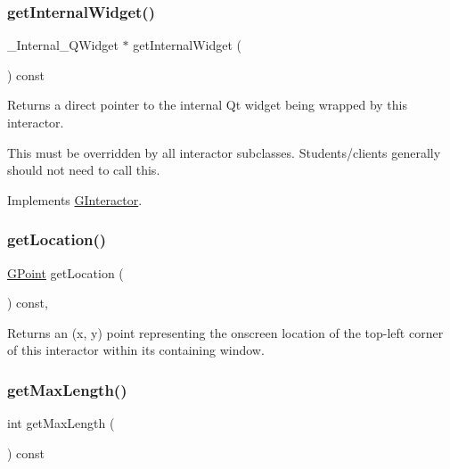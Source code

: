 \subsubsection{\texorpdfstring{get\+Internal\+Widget()}{getInternalWidget()}}
{\footnotesize\ttfamily \+\_\+\+Internal\+\_\+\+Q\+Widget $\ast$ get\+Internal\+Widget (\begin{DoxyParamCaption}{ }\end{DoxyParamCaption}) const\hspace{0.3cm}{\ttfamily [virtual]}}



Returns a direct pointer to the internal Qt widget being wrapped by this interactor. 

This must be overridden by all interactor subclasses. Students/clients generally should not need to call this. 

Implements \mbox{\hyperlink{classGInteractor}{G\+Interactor}}.

\mbox{\label{classGInteractor_a4f83802015511edeb63b892830812c11}} 
\subsubsection{\texorpdfstring{get\+Location()}{getLocation()}}
{\footnotesize\ttfamily \mbox{\hyperlink{classGPoint}{G\+Point}} get\+Location (\begin{DoxyParamCaption}{ }\end{DoxyParamCaption}) const\hspace{0.3cm}{\ttfamily [virtual]}, {\ttfamily [inherited]}}



Returns an (x, y) point representing the onscreen location of the top-\/left corner of this interactor within its containing window. 

\mbox{\label{classGTextField_a465e41b66da9e75443bf0b7951582468}} 
\subsubsection{\texorpdfstring{get\+Max\+Length()}{getMaxLength()}}
{\footnotesize\ttfamily int get\+Max\+Length (\begin{DoxyParamCaption}{ }\end{DoxyParamCaption}) const\hspace{0.3cm}{\ttfamily [virtual]}}



